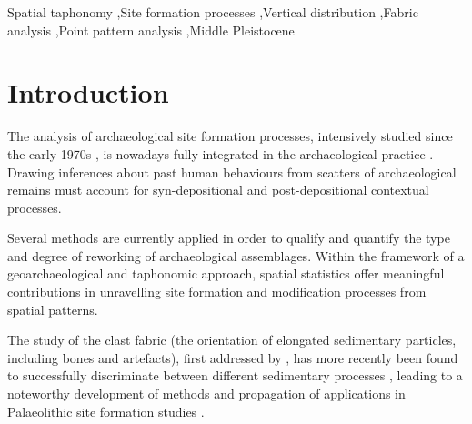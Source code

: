 \documentclass[review,authoryear,times]{elsarticle} %
\begin{document}
\begin{frontmatter}
  \begin{keyword}
    Spatial taphonomy \sep Site formation processes \sep Vertical distribution \sep Fabric analysis \sep Point pattern analysis \sep Middle Pleistocene
  \end{keyword}
  
\end{frontmatter}

\linenumbers

\section{Introduction}

The analysis of archaeological site formation processes, intensively studied since the early 1970s \citep[][among others]{Isaac1967,Schiffer1972,Schiffer1983,Schiffer1987,Shackley1978,Wood1978,Schick1984,Schick1986,Schick1987,Petraglia1987,Petraglia1994} %
, is nowadays fully integrated in the archaeological practice \citep[][among others]{Texier2000,Villa2004,Bailey2007,Brantingham2007,Malinsky-Buller2011,Vaquero2012,Bargallo2016}. Drawing inferences about past human behaviours from scatters of archaeological remains must account for syn-depositional and post-depositional contextual processes.

Several methods are currently applied in order to qualify and quantify the type and degree of reworking of archaeological assemblages. Within the framework of a geoarchaeological and taphonomic approach, spatial statistics offer meaningful contributions in unravelling site formation and modification processes from spatial patterns.


The study of the clast fabric (the orientation of elongated sedimentary particles, including bones and artefacts), first addressed by \cite{Voorhies1966,Isaac1967,Bar-Yosef1972,Schick1986} %
, has more recently been found to successfully discriminate between different sedimentary processes \citep{Bertran1995,Bertran1997}, leading to a noteworthy development of methods and propagation of applications in Palaeolithic site formation studies \citep[][among others]{Lenoble2004,Lenoble2008,McPherron2005,Benito-Calvo2009,Benito-Calvo2011a,Benito-Calvo2011,Bernatchez2010,Boschian2010,Dominguez-Rodrigo2012,Dominguez-Rodrigo2013,Dominguez-Rodrigo2014,Torre2013a,Walter2013,Garcia-Moreno2016,Sanchez-Romero2016}.
\end{document}
